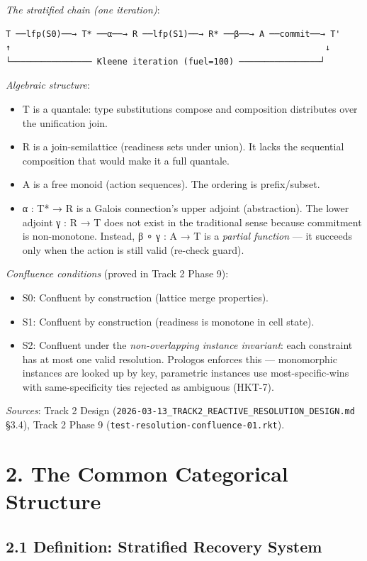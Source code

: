 \documentclass[11pt]{article}
\begin{document}
\emph{The stratified chain (one iteration)}:

\begin{verbatim}
T ──lfp(S0)──→ T* ──α──→ R ──lfp(S1)──→ R* ──β──→ A ──commit──→ T'
↑                                                              ↓
└──────────────── Kleene iteration (fuel=100) ────────────────┘
\end{verbatim}

\emph{Algebraic structure}:
\begin{itemize}
\item T is a quantale: type substitutions compose and composition distributes over
the unification join.
\item R is a join-semilattice (readiness sets under union). It lacks the sequential
composition that would make it a full quantale.
\item A is a free monoid (action sequences). The ordering is prefix/subset.
\item α : T* → R is a Galois connection's upper adjoint (abstraction). The lower
adjoint γ : R → T does not exist in the traditional sense because commitment
is non-monotone. Instead, β ∘ γ : A → T is a \emph{partial function} — it succeeds
only when the action is still valid (re-check guard).
\end{itemize}

\emph{Confluence conditions} (proved in Track 2 Phase 9):
\begin{itemize}
\item S0: Confluent by construction (lattice merge properties).
\item S1: Confluent by construction (readiness is monotone in cell state).
\item S2: Confluent under the \emph{non-overlapping instance invariant}: each constraint
has at most one valid resolution. Prologos enforces this — monomorphic
instances are looked up by key, parametric instances use most-specific-wins
with same-specificity ties rejected as ambiguous (HKT-7).
\end{itemize}

\emph{Sources}: Track 2 Design (\texttt{2026-03-13\_TRACK2\_REACTIVE\_RESOLUTION\_DESIGN.md} §3.4),
Track 2 Phase 9 (\texttt{test-resolution-confluence-01.rkt}).
\section{2. The Common Categorical Structure}
\label{sec:org847acb7}

\subsection{2.1 Definition: Stratified Recovery System}
\label{sec:orgfd76091}
\end{document}
